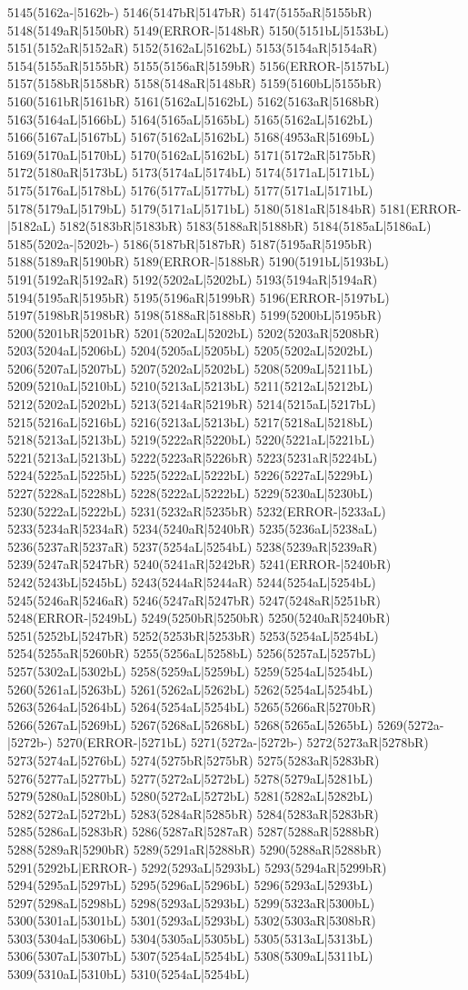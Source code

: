 5145(5162a-|5162b-) 5146(5147bR|5147bR) 5147(5155aR|5155bR) 5148(5149aR|5150bR) 5149(ERROR-|5148bR) 5150(5151bL|5153bL) 5151(5152aR|5152aR) 5152(5162aL|5162bL) 5153(5154aR|5154aR) 5154(5155aR|5155bR) 5155(5156aR|5159bR) 5156(ERROR-|5157bL) 5157(5158bR|5158bR) 5158(5148aR|5148bR) 5159(5160bL|5155bR) 5160(5161bR|5161bR) 5161(5162aL|5162bL) 5162(5163aR|5168bR) 5163(5164aL|5166bL) 5164(5165aL|5165bL) 5165(5162aL|5162bL) 5166(5167aL|5167bL) 5167(5162aL|5162bL) 5168(4953aR|5169bL) 5169(5170aL|5170bL) 5170(5162aL|5162bL) 5171(5172aR|5175bR) 5172(5180aR|5173bL) 5173(5174aL|5174bL) 5174(5171aL|5171bL) 5175(5176aL|5178bL) 5176(5177aL|5177bL) 5177(5171aL|5171bL) 5178(5179aL|5179bL) 5179(5171aL|5171bL) 5180(5181aR|5184bR) 5181(ERROR-|5182aL) 5182(5183bR|5183bR) 5183(5188aR|5188bR) 5184(5185aL|5186aL) 5185(5202a-|5202b-) 5186(5187bR|5187bR) 5187(5195aR|5195bR) 5188(5189aR|5190bR) 5189(ERROR-|5188bR) 5190(5191bL|5193bL) 5191(5192aR|5192aR) 5192(5202aL|5202bL) 5193(5194aR|5194aR) 5194(5195aR|5195bR) 5195(5196aR|5199bR) 5196(ERROR-|5197bL) 5197(5198bR|5198bR) 5198(5188aR|5188bR) 5199(5200bL|5195bR) 5200(5201bR|5201bR) 5201(5202aL|5202bL) 5202(5203aR|5208bR) 5203(5204aL|5206bL) 5204(5205aL|5205bL) 5205(5202aL|5202bL) 5206(5207aL|5207bL) 5207(5202aL|5202bL) 5208(5209aL|5211bL) 5209(5210aL|5210bL) 5210(5213aL|5213bL) 5211(5212aL|5212bL) 5212(5202aL|5202bL) 5213(5214aR|5219bR) 5214(5215aL|5217bL) 5215(5216aL|5216bL) 5216(5213aL|5213bL) 5217(5218aL|5218bL) 5218(5213aL|5213bL) 5219(5222aR|5220bL) 5220(5221aL|5221bL) 5221(5213aL|5213bL) 5222(5223aR|5226bR) 5223(5231aR|5224bL) 5224(5225aL|5225bL) 5225(5222aL|5222bL) 5226(5227aL|5229bL) 5227(5228aL|5228bL) 5228(5222aL|5222bL) 5229(5230aL|5230bL) 5230(5222aL|5222bL) 5231(5232aR|5235bR) 5232(ERROR-|5233aL) 5233(5234aR|5234aR) 5234(5240aR|5240bR) 5235(5236aL|5238aL) 5236(5237aR|5237aR) 5237(5254aL|5254bL) 5238(5239aR|5239aR) 5239(5247aR|5247bR) 5240(5241aR|5242bR) 5241(ERROR-|5240bR) 5242(5243bL|5245bL) 5243(5244aR|5244aR) 5244(5254aL|5254bL) 5245(5246aR|5246aR) 5246(5247aR|5247bR) 5247(5248aR|5251bR) 5248(ERROR-|5249bL) 5249(5250bR|5250bR) 5250(5240aR|5240bR) 5251(5252bL|5247bR) 5252(5253bR|5253bR) 5253(5254aL|5254bL) 5254(5255aR|5260bR) 5255(5256aL|5258bL) 5256(5257aL|5257bL) 5257(5302aL|5302bL) 5258(5259aL|5259bL) 5259(5254aL|5254bL) 5260(5261aL|5263bL) 5261(5262aL|5262bL) 5262(5254aL|5254bL) 5263(5264aL|5264bL) 5264(5254aL|5254bL) 5265(5266aR|5270bR) 5266(5267aL|5269bL) 5267(5268aL|5268bL) 5268(5265aL|5265bL) 5269(5272a-|5272b-) 5270(ERROR-|5271bL) 5271(5272a-|5272b-) 5272(5273aR|5278bR) 5273(5274aL|5276bL) 5274(5275bR|5275bR) 5275(5283aR|5283bR) 5276(5277aL|5277bL) 5277(5272aL|5272bL) 5278(5279aL|5281bL) 5279(5280aL|5280bL) 5280(5272aL|5272bL) 5281(5282aL|5282bL) 5282(5272aL|5272bL) 5283(5284aR|5285bR) 5284(5283aR|5283bR) 5285(5286aL|5283bR) 5286(5287aR|5287aR) 5287(5288aR|5288bR) 5288(5289aR|5290bR) 5289(5291aR|5288bR) 5290(5288aR|5288bR) 5291(5292bL|ERROR-) 5292(5293aL|5293bL) 5293(5294aR|5299bR) 5294(5295aL|5297bL) 5295(5296aL|5296bL) 5296(5293aL|5293bL) 5297(5298aL|5298bL) 5298(5293aL|5293bL) 5299(5323aR|5300bL) 5300(5301aL|5301bL) 5301(5293aL|5293bL) 5302(5303aR|5308bR) 5303(5304aL|5306bL) 5304(5305aL|5305bL) 5305(5313aL|5313bL) 5306(5307aL|5307bL) 5307(5254aL|5254bL) 5308(5309aL|5311bL) 5309(5310aL|5310bL) 5310(5254aL|5254bL) 